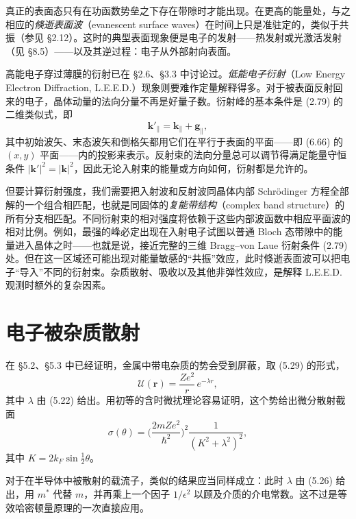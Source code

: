 真正的表面态只有在功函数势垒之下存在带隙时才能出现。在更高的能量处，与之相应的\emph{倏逝表面波}（evanescent surface waves）在时间上只是准驻定的，类似于共振（参见 §2.12）。这时的典型表面现象便是电子的发射——热发射或光激活发射（见 §8.5）——以及其逆过程：电子从外部射向表面。

高能电子穿过薄膜的衍射已在 §2.6、§3.3 中讨论过。\emph{低能电子衍射}（Low Energy Electron Diffraction, L.E.E.D.）现象则要难作定量解释得多。对于被表面反射回来的电子，晶体动量的法向分量不再是好量子数。衍射峰的基本条件是 (2.79) 的二维类似式，即
\begin{equation*}
\mathbf{k}'_{\parallel}=\mathbf{k}_{\parallel}+\mathbf{g}_{\parallel}, \tag{6.68}
\end{equation*}
其中初始波矢、末态波矢和倒格矢都用它们在平行于表面的平面——即 (6.66) 的 $(x,y)$ 平面——内的投影来表示。反射束的法向分量总可以调节得满足能量守恒条件 $|\mathbf{k}'|^{2}=|\mathbf{k}|^{2}$，因此无论入射束的能量或方向如何，衍射都是允许的。

但要计算衍射强度，我们需要把入射波和反射波同晶体内部 Schrödinger 方程全部解的一个组合相匹配，也就是同固体的\emph{复能带结构}（complex band structure）的所有分支相匹配。不同衍射束的相对强度将依赖于这些内部波函数中相应平面波的相对比例。例如，最强的峰必定出现在入射电子试图以普通 Bloch 态带隙中的能量进入晶体之时——也就是说，接近完整的三维 Bragg--von Laue 衍射条件 (2.79) 处。但在这一区域还可能出现对能量敏感的“共振”效应，此时倏逝表面波可以把电子“导入”不同的衍射束。杂质散射、吸收以及其他非弹性效应，是解释 L.E.E.D. 观测时额外的复杂因素。

\section{电子被杂质散射}

在 §5.2、§5.3 中已经证明，金属中带电杂质的势会受到屏蔽，取 (5.29) 的形式，
\begin{equation*}
\mathcal{U}(\mathbf{r})=\frac{Ze^{2}}{r}\,e^{-\lambda r}, \tag{6.69}
\end{equation*}
其中 $\lambda$ 由 (5.22) 给出。用初等的含时微扰理论容易证明，这个势给出微分散射截面
\begin{equation*}
\sigma(\theta)=\biggl(\frac{2mZe^{2}}{\hbar^{2}}\biggr)^{2}\frac{1}{(K^{2}+\lambda^{2})^{2}}, \tag{6.70}
\end{equation*}
其中 $K=2k_{F}\sin\tfrac{1}{2}\theta$。

对于在半导体中被散射的载流子，类似的结果应当同样成立：此时 $\lambda$ 由 (5.26) 给出，用 $m^{*}$ 代替 $m$，并再乘上一个因子 $1/\epsilon^{2}$ 以顾及介质的介电常数。这不过是等效哈密顿量原理的一次直接应用。

